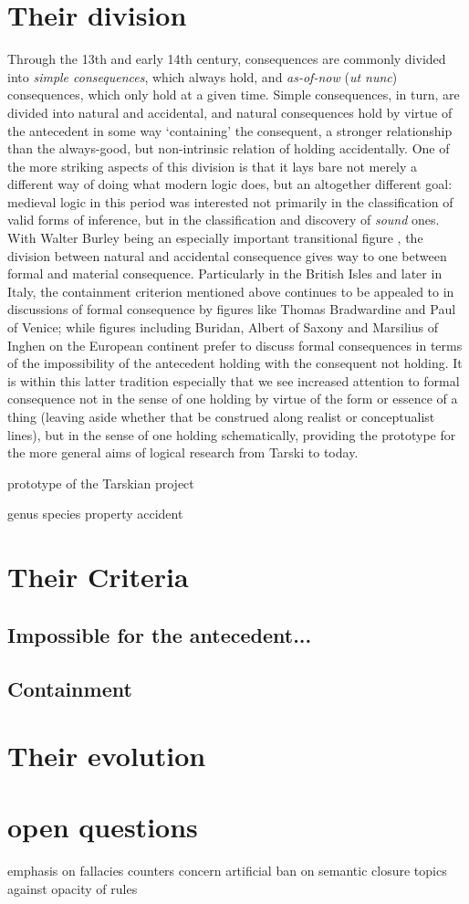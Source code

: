 \documentclass[]{article}
\begin{document}
\section{Their division}
Through the 13th and early 14th century, 
consequences are commonly divided into \emph{simple consequences}, 
which always hold, 
and \emph{as-of-now} (\emph{ut nunc}) consequences, 
which only hold at a given time. 
Simple consequences, 
in turn, 
are divided into natural and accidental, 
and natural consequences hold by virtue of the antecedent in some way `containing' the consequent, 
a stronger relationship than the always-good, 
but non-intrinsic relation of holding accidentally. 
One of the more striking aspects of this division is that it lays bare not merely a different way of doing what modern logic does, 
but an altogether different goal: 
medieval logic in this period was interested not primarily in the classification of valid forms of inference, 
but in the classification and discovery of \emph{sound} ones. 
With Walter Burley being an especially important transitional figure \autocite{Archambault2018b}, 
the division between natural and accidental consequence gives way to one between formal and material consequence. 
Particularly in the British Isles and later in Italy, 
the containment criterion mentioned above continues to be appealed to in discussions of formal consequence by figures like Thomas Bradwardine and Paul of Venice; 
while figures including Buridan, 
Albert of Saxony 
and Marsilius of Inghen on the European continent prefer to discuss formal consequences in terms of the impossibility of the antecedent holding with the consequent not holding. 
It is within this latter tradition especially that we see increased attention to formal consequence not in the sense of one holding by virtue of the form or essence of a thing 
(leaving aside whether that be construed along realist or conceptualist lines), 
but in the sense of one holding schematically, 
providing the prototype for the more general aims of logical research from Tarski to today. 

prototype of the Tarskian project 

genus
species 
property
accident
\section{Their Criteria}
\subsection{Impossible for the antecedent...}

\subsection{Containment}



\section{Their evolution}

\section{open questions}
emphasis on fallacies counters concern artificial ban on semantic closure
topics against opacity of rules
\printbibliography
\end{document}
